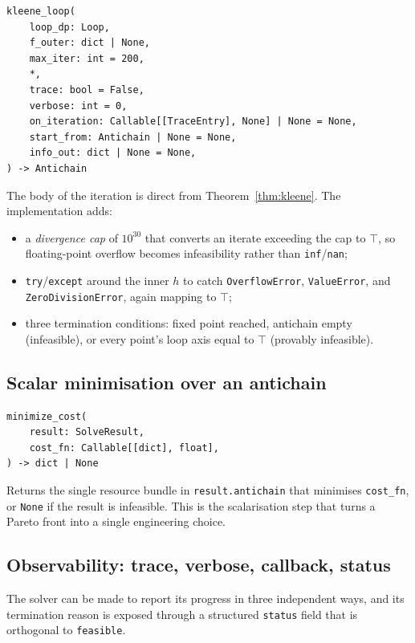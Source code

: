 \documentclass[11pt,a4paper]{article}
\newcommand{\topp}{\top}
\begin{document}
\begin{lstlisting}
kleene_loop(
    loop_dp: Loop,
    f_outer: dict | None,
    max_iter: int = 200,
    *,
    trace: bool = False,
    verbose: int = 0,
    on_iteration: Callable[[TraceEntry], None] | None = None,
    start_from: Antichain | None = None,
    info_out: dict | None = None,
) -> Antichain
\end{lstlisting}

The body of the iteration is direct from Theorem~\ref{thm:kleene}. The
implementation adds:
\begin{itemize}
  \item a \emph{divergence cap} of $10^{30}$ that converts an iterate
        exceeding the cap to $\topp$, so floating-point overflow
        becomes infeasibility rather than \texttt{inf}/\texttt{nan};
  \item \texttt{try}/\texttt{except} around the inner $h$ to catch
        \texttt{OverflowError}, \texttt{ValueError}, and
        \texttt{ZeroDivisionError}, again mapping to $\topp$;
  \item three termination conditions: fixed point reached, antichain
        empty (infeasible), or every point's loop axis equal to
        $\topp$ (provably infeasible).
\end{itemize}

\subsection{Scalar minimisation over an antichain}

\begin{lstlisting}
minimize_cost(
    result: SolveResult,
    cost_fn: Callable[[dict], float],
) -> dict | None
\end{lstlisting}

Returns the single resource bundle in \texttt{result.antichain} that
minimises \texttt{cost\_fn}, or \texttt{None} if the result is
infeasible. This is the scalarisation step that turns a Pareto front
into a single engineering choice.

\subsection{Observability: trace, verbose, callback, status}
\label{sec:solver-observability}

The solver can be made to report its progress in three independent
ways, and its termination reason is exposed through a structured
\texttt{status} field that is orthogonal to \texttt{feasible}.
\end{document}
